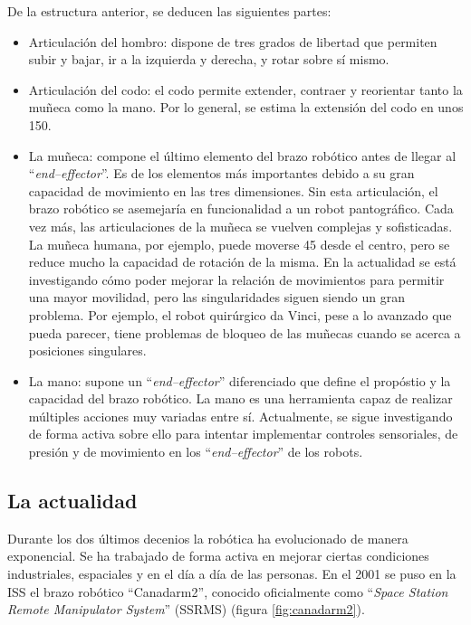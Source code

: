 De la estructura anterior, se deducen las siguientes partes:

\begin{itemize}
    \item Articulación del hombro: dispone de tres grados de libertad que permiten
    subir y bajar, ir a la izquierda y derecha, y rotar sobre sí mismo.
    \item Articulación del codo: el codo permite extender, contraer y reorientar tanto
    la muñeca como la mano. Por lo general, se estima la extensión del codo en unos
    150\textdegree.
    \item La muñeca: compone el último elemento del brazo robótico antes de llegar
    al ``\textit{end--effector}''. Es de los elementos más importantes debido a su
    gran capacidad de movimiento en las tres dimensiones. Sin esta articulación,
    el brazo robótico se asemejaría en funcionalidad a un robot pantográfico. Cada vez más,
    las articulaciones de la muñeca se vuelven complejas y sofisticadas. La muñeca humana,
    por ejemplo, puede moverse 45\textdegree{} desde el centro, pero se reduce mucho la
    capacidad de rotación de la misma. En la actualidad se está investigando cómo poder
    mejorar la relación de movimientos para permitir una mayor movilidad, pero las 
    singularidades siguen siendo un gran problema. Por ejemplo, el robot quirúrgico
    da Vinci, pese a lo avanzado que pueda parecer, tiene problemas de bloqueo de las muñecas
    cuando se acerca a posiciones singulares.
    \item La mano: supone un ``\textit{end--effector}'' diferenciado que define el propóstio
    y la capacidad del brazo robótico. La mano es una herramienta capaz de realizar múltiples
    acciones muy variadas entre sí. Actualmente, se sigue investigando de forma activa sobre
    ello para intentar implementar controles sensoriales, de presión y de movimiento en los
    ``\textit{end--effector}'' de los robots.
\end{itemize}

\subsection{La actualidad}

Durante los dos últimos decenios la robótica ha evolucionado de manera exponencial. Se ha
trabajado de forma activa en mejorar ciertas condiciones industriales, espaciales y
en el día a día de las personas. En el 2001 se puso en la ISS el brazo
robótico ``Canadarm2'', conocido oficialmente como 
``\textit{Space Station Remote Manipulator System}'' (SSRMS) (figura \ref{fig:canadarm2}).

